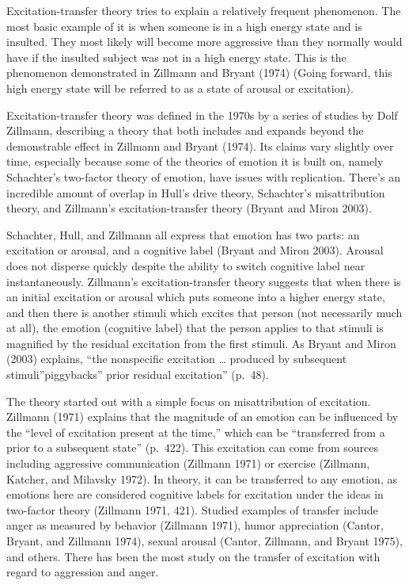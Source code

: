Excitation-transfer theory tries to explain a relatively frequent
phenomenon. The most basic example of it is when someone is in a high
energy state and is insulted. They most likely will become more
aggressive than they normally would have if the insulted subject was not
in a high energy state. This is the phenomenon demonstrated in {Zillmann
and Bryant (1974)} (Going forward, this high energy state will be
referred to as a state of arousal or excitation).

Excitation-transfer theory was defined in the 1970s by a series of
studies by Dolf Zillmann, describing a theory that both includes and
expands beyond the demonstrable effect in {Zillmann and Bryant (1974)}.
Its claims vary slightly over time, especially because some of the
theories of emotion it is built on, namely Schachter's two-factor theory
of emotion, have issues with replication. There's an incredible amount
of overlap in Hull's drive theory, Schachter's misattribution theory,
and Zillmann's excitation-transfer theory {(Bryant and Miron 2003)}.

Schachter, Hull, and Zillmann all express that emotion has two parts: an
excitation or arousal, and a cognitive label {(Bryant and Miron 2003)}.
Arousal does not disperse quickly despite the ability to switch
cognitive label near instantaneously. Zillmann's excitation-transfer
theory suggests that when there is an initial excitation or arousal
which puts someone into a higher energy state, and then there is another
stimuli which excites that person (not necessarily much at all), the
emotion (cognitive label) that the person applies to that stimuli is
magnified by the residual excitation from the first stimuli. As {Bryant
and Miron (2003)} explains, ``the nonspecific excitation \ldots{}
produced by subsequent stimuli''piggybacks'' prior residual excitation''
(p.~48).

The theory started out with a simple focus on misattribution of
excitation. {Zillmann (1971)} explains that the magnitude of an emotion
can be influenced by the ``level of excitation present at the time,''
which can be ``transferred from a prior to a subsequent state''
(p.~422). This excitation can come from sources including aggressive
communication {(Zillmann 1971)} or exercise {(Zillmann, Katcher, and
Milavsky 1972)}. In theory, it can be transferred to any emotion, as
emotions here are considered cognitive labels for excitation under the
ideas in two-factor theory {(Zillmann 1971, 421)}. Studied examples of
transfer include anger as measured by behavior {(Zillmann 1971)}, humor
appreciation {(Cantor, Bryant, and Zillmann 1974)}, sexual arousal
{(Cantor, Zillmann, and Bryant 1975)}, and others. There has been the
most study on the transfer of excitation with regard to aggression and
anger.

